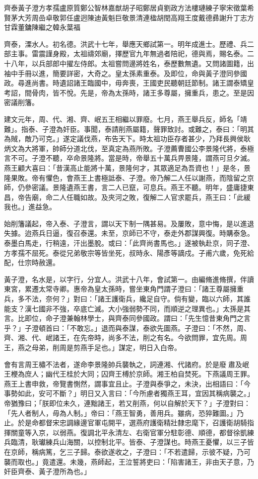 
\begin{pinyinscope}
齊泰黃子澄方孝孺盧原質鄭公智林嘉猷胡子昭鄭居貞劉政方法樓璉練子寧宋徵葉希賢茅大芳周嵒卓敬郭任盧迥陳迪黃魁巨敬景清連楹胡閏高翔王度戴德彞謝升丁志方甘霖董鏞陳繼之韓永葉福

齊泰，溧水人。初名德。洪武十七年，舉應天鄉試第一。明年成進士。歷禮、兵二部主事。雷震謹身殿，太祖禱郊廟，擇歷官九年無過者陪祀，德與焉，賜名泰。二十八年，以兵部郎中擢左侍郎。太祖嘗問邊將姓名，泰歷數無遺。又問諸圖籍，出袖中手冊以進，簡要詳密，大奇之。皇太孫素重泰。及即位，命與黃子澄同參國政。尋進尚書。時遺詔諸王臨國中，毋奔喪，王國吏民聽朝廷節制。諸王謂泰矯皇考詔，間骨肉，皆不悅。先是，帝為太孫時，諸王多尊屬，擁重兵，患之。至是因密議削籓。

建文元年，周、代、湘、齊、岷五王相繼以罪廢。七月，燕王舉兵反，師名「靖難」。指泰、子澄為奸臣。事聞，泰請削燕屬籍，聲罪致討。或難之，泰曰：「明其為賊，敵乃可克。」遂定議伐燕，布告天下。時太祖功臣存者甚少，乃拜長興侯耿炳文為大將軍，帥師分道北伐，至真定為燕所敗。子澄薦曹國公李景隆代將，泰極言不可。子澄不聽，卒命景隆將。當是時，帝舉五十萬兵畀景隆，謂燕可旦夕滅。燕王顧大喜曰：「昔漢高止能將十萬，景隆何才，其眾適足為吾資也！」是冬，景隆果敗。帝有懼色，會燕王上書極詆泰、子澄。帝乃解二人任以謝燕，而陰留之京師，仍參密議。景隆遺燕王書，言二人已竄，可息兵。燕王不聽。明年，盛庸捷東昌，帝告廟，命二人任職如故。及夾河之敗，復解二人官求罷兵，燕王曰：「此緩我也。」進益急。

始削籓議起，帝入泰、子澄言，謂以天下制一隅甚易。及屢敗，意中悔，是以進退失據。迨燕兵日逼，復召泰還。未至，京師已不守，泰走外郡謀興復。時購泰急。泰墨白馬走，行稍遠，汗出墨脫。或曰：「此齊尚書馬也。」遂被執赴京，同子澄、方孝孺不屈死。泰從兄弟敬宗等皆坐死，叔時永、陽彥等謫戍。子甫六歲，免死給配，仕宗時赦還。

黃子澄，名水是，以字行，分宜人。洪武十八年，會試第一。由編脩進脩撰，伴讀東宮，累遷太常寺卿。惠帝為皇太孫時，嘗坐東角門謂子澄曰：「諸王尊屬擁重兵，多不法，奈何？」對曰：「諸王護衛兵，纔足自守。倘有變，臨以六師，其誰能支？漢七國非不強，卒底亡滅。大小強弱勢不同，而順逆之理異也。」太孫是其言。比即位，命子澄兼翰林學士，與齊泰同參國政。謂曰：「先生憶昔東角門之言乎？」子澄頓首曰：「不敢忘。」退而與泰謀，泰欲先圖燕。子澄曰：「不然，周、齊、湘、代、岷諸王，在先帝時，尚多不法，削之有名。今欲問罪，宜先周。周王，燕之母弟，削周是剪燕手足也。」謀定，明日入白帝。

會有言周王橚不法者，遂命李景隆帥兵襲執之，詞連湘、代諸府。於是廢肅及岷王楩為庶人；幽代王桂於大同；囚齊王榑於京師。湘王柏自焚死。下燕議周王罪。燕王上書申救，帝覽書惻然，謂事宜且止。子澄與泰爭之，未決，出相語曰：「今事勢如此，安可不斷？」明日又入言曰：「今所慮者獨燕王耳，宜因其稱病襲之。」帝猶豫曰；「朕即位未久，連黜諸王，若又削燕，何以自解於天下？」子澄對曰：「先人者制人，毋為人制。」帝曰：「燕王智勇，善用兵。雖病，恐猝難圖。」乃止。於是命都督宋忠調緣邊官軍屯開平，選燕府護衛精壯隸忠麾下，召護衛胡騎指揮關童等入京，以弱燕。復調北平永清左、右衛官軍分駐彰德、順德，都督徐凱練兵臨清，耿瓛練兵山海關，以控制北平。皆泰、子澄謀也。時燕王憂懼，以三子皆在京師，稱病篤，乞三子歸。泰欲遂收之，子澄曰：「不若遣歸，示彼不疑，乃可襲而取也。」竟遣還。未幾，燕師起，王泣誓將吏曰：「陷害諸王，非由天子意，乃奸臣齊泰、黃子澄所為也。」


\end{pinyinscope}
